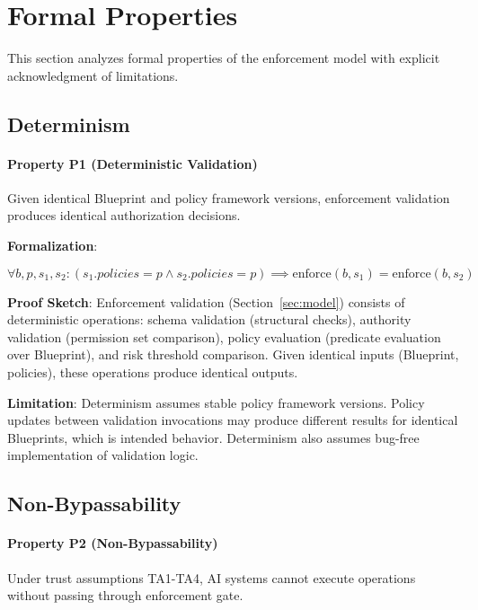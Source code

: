 \documentclass[11pt,letterpaper]{article}
\begin{document}
\section{Formal Properties}
\label{sec:properties}

This section analyzes formal properties of the enforcement model with explicit acknowledgment of limitations.

\subsection{Determinism}

\paragraph{Property P1 (Deterministic Validation)} Given identical Blueprint and policy framework versions, enforcement validation produces identical authorization decisions.

\textbf{Formalization}:

\begin{equation}
\forall b, p, s_1, s_2: (s_1.policies = p \land s_2.policies = p) \implies \text{enforce}(b, s_1) = \text{enforce}(b, s_2)
\end{equation}

\textbf{Proof Sketch}: Enforcement validation (Section~\ref{sec:model}) consists of deterministic operations: schema validation (structural checks), authority validation (permission set comparison), policy evaluation (predicate evaluation over Blueprint), and risk threshold comparison. Given identical inputs (Blueprint, policies), these operations produce identical outputs.

\textbf{Limitation}: Determinism assumes stable policy framework versions. Policy updates between validation invocations may produce different results for identical Blueprints, which is intended behavior. Determinism also assumes bug-free implementation of validation logic.

\subsection{Non-Bypassability}

\paragraph{Property P2 (Non-Bypassability)} Under trust assumptions TA1-TA4, AI systems cannot execute operations without passing through enforcement gate.
\end{document}
